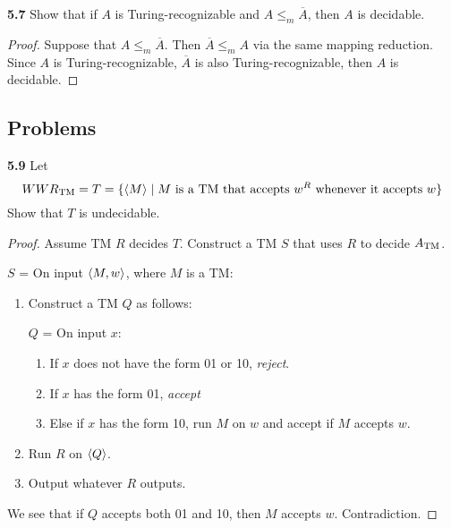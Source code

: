 \textbf{5.7} Show that if $A$ is Turing-recognizable and $A \leq_m \overline{A}$, then $A$ is decidable.

\begin{mdframed}
\begin{proof}
Suppose that $A \leq_m \overline{A}$. Then $\overline{A} \leq_m A$ via the same mapping reduction. Since $A$ is Turing-recognizable, $\overline{A}$ is also Turing-recognizable, then $A$ is decidable.
\end{proof}
\end{mdframed}

\subsection{Problems}

\label{lang:WWRTM_UDCDB}
\textbf{5.9} Let
\[
WWR_{\text{TM}} = T = \{\langle{M}\rangle \mid \text{$M$ is a TM that accepts $w^R$ whenever it accepts $w$}\}
\]
Show that $T$ is undecidable.

\begin{mdframed}
\begin{proof}
Assume TM $R$ decides $T$. Construct a TM $S$ that uses $R$ to decide $A_{\text{TM}}$.

\medskip
$S$ = On input $\langle{M, w}\rangle$, where $M$ is a TM:
\begin{enumerate}
\item Construct a TM $Q$ as follows:

$Q$ = On input $x$:
\begin{enumerate}
\item If $x$ does not have the form 01 or 10, \textit{reject}.
\item If $x$ has the form 01, \textit{accept}
\item Else if $x$ has the form 10, run $M$ on $w$ and accept if $M$ accepts $w$.
\end{enumerate}
\item Run $R$ on $\langle{Q}\rangle$.
\item Output whatever $R$ outputs.
\end{enumerate}

We see that if $Q$ accepts both 01 and 10, then $M$ accepts $w$. Contradiction.
\end{proof}
\end{mdframed}

